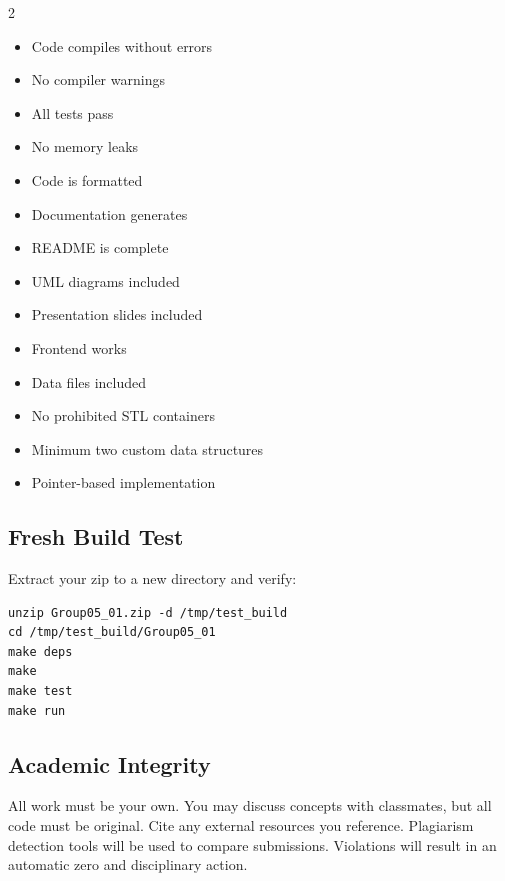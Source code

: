 \begin{multicols}{2}
\begin{itemize}
  \item[\checkbox] Code compiles without errors
  \item[\checkbox] No compiler warnings
  \item[\checkbox] All tests pass
  \item[\checkbox] No memory leaks
  \item[\checkbox] Code is formatted
  \item[\checkbox] Documentation generates
  \item[\checkbox] README is complete
  \item[\checkbox] UML diagrams included
  \item[\checkbox] Presentation slides included
  \item[\checkbox] Frontend works
  \item[\checkbox] Data files included
  \item[\checkbox] No prohibited STL containers
  \item[\checkbox] Minimum two custom data structures
  \item[\checkbox] Pointer-based implementation
\end{itemize}
\end{multicols}

\subsection{Fresh Build Test}

Extract your zip to a new directory and verify:

\begin{lstlisting}[style=bash]
unzip Group05_01.zip -d /tmp/test_build
cd /tmp/test_build/Group05_01
make deps
make
make test
make run
\end{lstlisting}

\subsection{Academic Integrity}

All work must be your own. You may discuss concepts with classmates, but all code must be original. Cite any external resources you reference. Plagiarism detection tools will be used to compare submissions. Violations will result in an automatic zero and disciplinary action.
